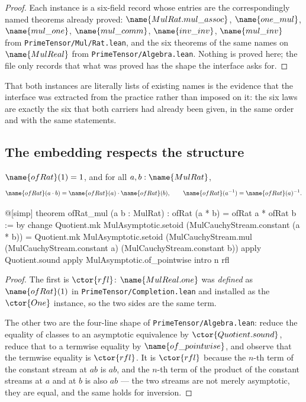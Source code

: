 \begin{proof}
Each instance is a six-field record whose entries are the correspondingly named
theorems already proved: $\name{MulRat.mul\_assoc}$, $\name{one\_mul}$,
$\name{mul\_one}$, $\name{mul\_comm}$, $\name{inv\_inv}$, $\name{mul\_inv}$
from \texttt{PrimeTensor/Mul/Rat.lean}, and the six theorems of the same names
on $\name{MulReal}$ from \texttt{PrimeTensor/Algebra.lean}.  Nothing is proved
here; the file only records that what was proved has the shape the interface
asks for.
\end{proof}

That both instances are literally lists of existing names is the evidence that
the interface was extracted from the practice rather than imposed on it: the
six laws are exactly the six that both carriers had already been given, in the
same order and with the same statements.

\subsection{The embedding respects the structure}

\begin{lemma}
\label{Structure:lem:ofrat}
$\name{ofRat}(1) = 1$, and for all $a, b : \name{MulRat}$,
\[
  \name{ofRat}(a \cdot b) = \name{ofRat}(a) \cdot \name{ofRat}(b),
  \qquad
  \name{ofRat}(a^{-1}) = \name{ofRat}(a)^{-1} .
\]
\end{lemma}

\begin{leancode}
@[simp] theorem ofRat_mul (a b : MulRat) :
    ofRat (a * b) = ofRat a * ofRat b := by
  change
    Quotient.mk MulAsymptotic.setoid (MulCauchyStream.constant (a * b)) =
      Quotient.mk MulAsymptotic.setoid
        (MulCauchyStream.mul
          (MulCauchyStream.constant a)
          (MulCauchyStream.constant b))
  apply Quotient.sound
  apply MulAsymptotic.of_pointwise
  intro n
  rfl
\end{leancode}

\begin{proof}
The first is $\ctor{rfl}$: $\name{MulReal.one}$ was \emph{defined} as
$\name{ofRat}(1)$ in \texttt{PrimeTensor/Completion.lean} and installed as the
$\ctor{One}$ instance, so the two sides are the same term.

The other two are the four-line shape of
\texttt{PrimeTensor/Algebra.lean}: reduce the equality of classes to an
asymptotic equivalence by $\ctor{Quotient.sound}$, reduce that to a termwise
equality by $\name{of\_pointwise}$, and observe that the termwise equality is
$\ctor{rfl}$.  It is $\ctor{rfl}$ because the $n$-th term of the constant
stream at $ab$ is $ab$, and the $n$-th term of the product of the constant
streams at $a$ and at $b$ is also $ab$ --- the two streams are not merely
asymptotic, they are equal, and the same holds for inversion.
\end{proof}

